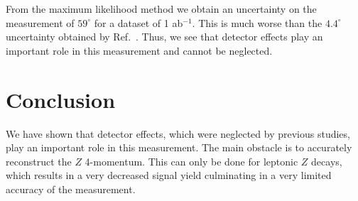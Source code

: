\documentclass[preprintnumbers,nofootinbib,noshowpacs,eqsecnum,prd,superscriptaddress,letterpaper]{revtex4}
\begin{document}
From the maximum likelihood method we obtain an uncertainty on the measurement of $59^\circ$ for a dataset of 1 ab$^{-1}$. This is much worse than the $4.4^\circ$ uncertainty obtained by Ref.~\cite{harnik}. Thus, we see that detector effects play an important role in this measurement and cannot be neglected.

\section{Conclusion}
\label{sec:conclusion}

We have shown that detector effects, which were neglected by previous studies, play an important role in this measurement. The main obstacle is to accurately reconstruct the $Z$ 4-momentum. This can only be done for leptonic $Z$ decays, which results in a very decreased signal yield culminating in a very limited accuracy of the measurement.

\clearpage
\end{document}
